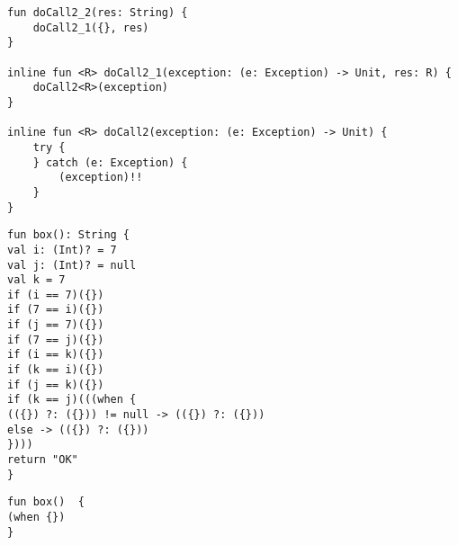 \begin{lstlisting}[caption = Результат применения разработанного алгоритма редукции к файлу intReturnComplex4.kt1544248458.kt]
fun doCall2_2(res: String) {
    doCall2_1({}, res)
}

inline fun <R> doCall2_1(exception: (e: Exception) -> Unit, res: R) {
    doCall2<R>(exception)
}

inline fun <R> doCall2(exception: (e: Exception) -> Unit) {
    try {
    } catch (e: Exception) {
        (exception)!!
    }
}
\end{lstlisting}

\begin{lstlisting}[caption = Исходный код компиляторного теста kt242.kt-58744233.kt]
fun box(): String {
val i: (Int)? = 7
val j: (Int)? = null
val k = 7
if (i == 7)({})
if (7 == i)({})
if (j == 7)({})
if (7 == j)({})
if (i == k)({})
if (k == i)({})
if (j == k)({})
if (k == j)(((when {
(({}) ?: ({})) != null -> (({}) ?: ({}))
else -> (({}) ?: ({}))
})))
return "OK"
}
\end{lstlisting}

\begin{lstlisting}[caption = Результат применения разработанного алгоритма редукции к файлу kt242.kt-58744233.kt]
fun box()  {
(when {})
}
\end{lstlisting}


